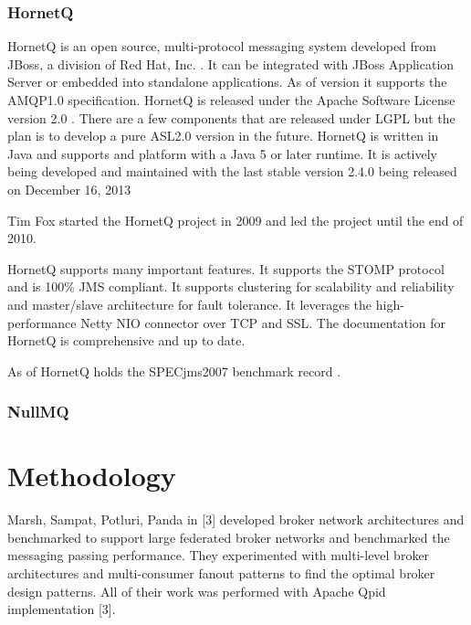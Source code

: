 \documentclass{thesis}
\begin{document}
\subsection{HornetQ}
HornetQ is an open source, multi-protocol messaging system developed from JBoss, a division of Red Hat, Inc. \cite{http://en.wikipedia.org/wiki/JBoss_(company)}.  It can be integrated with JBoss Application Server or embedded into standalone applications.  As of version  it supports the AMQP1.0 specification.  HornetQ is released under the Apache Software License version 2.0 .  There are a few components that are released under LGPL  but the plan is to develop a pure ASL2.0 version in the future.  HornetQ is written in Java and supports and platform with a Java 5 or later runtime.   It is actively being developed and maintained with the last stable version 2.4.0 being released on December 16, 2013 

Tim Fox started the HornetQ project in 2009 and led the project until the end of 2010. 

HornetQ supports many important features.  It supports the STOMP  protocol and is 100\% JMS compliant.  It supports clustering for scalability and reliability and master/slave architecture for fault tolerance.  It leverages the high-performance Netty NIO connector over TCP and SSL.  The documentation for HornetQ is comprehensive and up to date.  

As of  HornetQ holds the SPECjms2007 benchmark record .  



\subsection{NullMQ}

\chapter{Methodology}
Marsh, Sampat, Potluri, Panda in [3] developed broker network architectures and benchmarked to support large federated broker networks and benchmarked the messaging passing performance.  They experimented with multi-level broker architectures and multi-consumer fanout patterns to find the optimal broker design patterns.  All of their work was performed with Apache Qpid implementation [3].  
\end{document}
